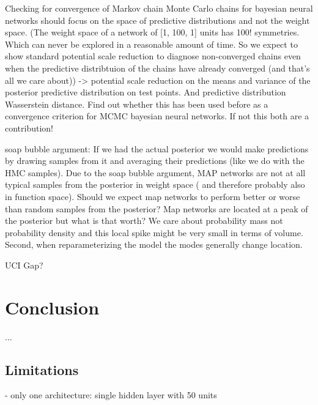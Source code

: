 \documentclass[12pt, A4, twoside]{report}
\begin{document}
Checking for convergence of Markov chain Monte Carlo chains for bayesian neural networks should focus on the space of predictive distributions and not the weight space. (The weight space of a network of [1, 100, 1] units has 100! symmetries. Which can never be explored in a reasonable amount of time. So we expect to show standard potential scale reduction to diagnose non-converged chains even when the predictive distribtuion of the chains have already converged (and that's all we care about)) ->  potential scale reduction on the means and variance of the posterior predictive distribution on test points. And predictive distribution Wasserstein distance.
Find out whether this has been used before as a convergence criterion for MCMC bayesian neural networks. If not this both are a contribution!


soap bubble argument: If we had the actual posterior we would make predictions by drawing samples from it and averaging their predictions (like we do with the HMC samples). Due to the soap bubble argument, MAP networks are not at all typical samples from the posterior in weight space ( and therefore probably also in function space). Should we expect map networks to perform better or worse than random samples from the posterior? Map networks are located at a peak of the posterior but what is that worth? We care about probability mass not probability density and this local spike might be very small in terms of volume. Second, when reparameterizing the model the modes generally change location.


UCI Gap?


\chapter{Conclusion}
...

\section{Limitations}
- only one architecture: single hidden layer with 50 units
\end{document}
